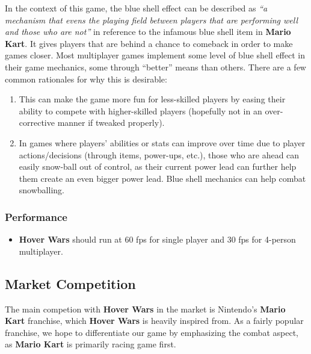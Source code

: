 \documentclass{article}
\newcommand{\namenobold}{Hover Wars}
\newcommand{\name}{\textbf{\namenobold}}
\theoremstyle{definition}
\begin{document}
In the context of this game, the blue shell effect can be described as
\textit{``a mechanism that evens the playing field between players that are
performing well and those who are not''} in reference to the infamous blue
shell item in \textbf{Mario Kart}. It gives players that are behind a chance to
comeback in order to make games closer. Most multiplayer games implement some
level of blue shell effect in their game mechanics, some through ``better''
means than others. There are a few common rationales for why this is desirable:
\begin{enumerate}
  \item This can make the game more fun for less-skilled players by
    easing their ability to compete with higher-skilled players (hopefully not
    in an over-corrective manner if tweaked properly).
  \item In games where players' abilities or stats can improve over time due to
    player actions/decisions (through items, power-ups, etc.), those who are
    ahead can easily snow-ball out of control, as their current power lead can
    further help them create an even bigger power lead. Blue shell mechanics
    can help combat snowballing.
\end{enumerate}


\subsubsection{Performance}

\begin{itemize}
  \item \name{} should run at 60 fps for single player and 30 fps for
    4-person multiplayer.
\end{itemize}

\subsection{Market Competition}

The main competion with \name{} in the market is Nintendo's \textbf{Mario Kart}
franchise, which \name{} is heavily inspired from. As a fairly popular
franchise, we hope to differentiate our game by emphasizing the combat aspect,
as \textbf{Mario Kart} is primarily racing game first.
\end{document}
